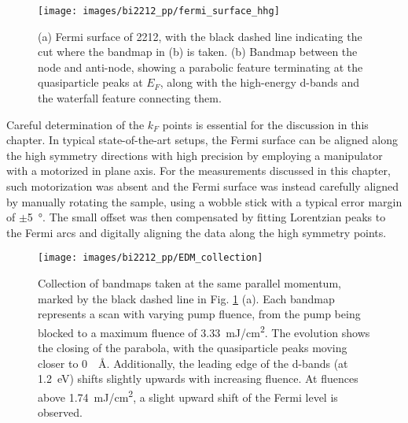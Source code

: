 
\begin{figure}[t]
	\centering
	\texttt{[image: images/bi2212\_pp/fermi\_surface\_hhg]}
	\caption{(a) Fermi surface of 2212, with the black dashed line indicating the cut where the bandmap in (b) is taken. (b) Bandmap between the node and anti-node, showing a parabolic feature terminating at the quasiparticle peaks at $E_F$, along with the high-energy  d-bands and the waterfall feature connecting them.}
	\label{fig:fs_cut}
\end{figure}


Careful determination of the $k_F$ points is essential for the discussion in this chapter.
In typical state-of-the-art setups, the Fermi surface can be aligned along the high symmetry directions with high precision by employing a manipulator with a motorized in plane axis.
For the measurements discussed in this chapter, such motorization was absent and the Fermi surface was instead carefully aligned by manually rotating the sample, using a wobble stick with a typical error margin of $\pm$\qty{5}{\degree}.
The small offset was then compensated by fitting Lorentzian peaks to the Fermi arcs and digitally aligning the data along the high symmetry points.

\begin{figure}[th!]
	\centering
	\texttt{[image: images/bi2212\_pp/EDM\_collection]}
	\caption{Collection of bandmaps taken at the same parallel momentum, marked by the black dashed line in Fig. \ref{fig:fs_cut} (a). Each bandmap represents a scan with varying pump fluence, from the pump being blocked to a maximum fluence of \qty{3.33}{\milli\joule/\centi\meter\squared}. The evolution shows the closing of the parabola, with the quasiparticle peaks moving closer to \qty{0}{\per\angstrom}. Additionally, the leading edge of the  d-bands (at \qty{1.2}{\electronvolt}) shifts slightly upwards with increasing fluence. At fluences above \qty{1.74}{\milli\joule/\centi\meter\squared}, a slight upward shift of the Fermi level is observed.}
	\label{fig:edm_collection}
\end{figure}

